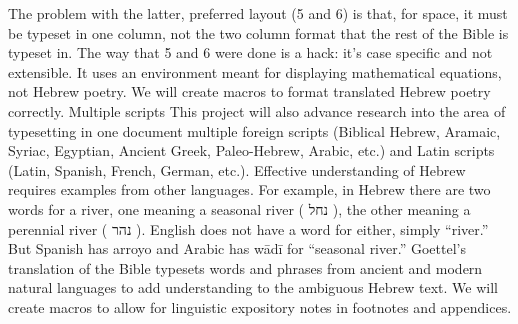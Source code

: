 \documentclass{acm_proc_article-sp}
\begin{document}
The problem with the latter, preferred layout (5 and 6) is that, for space, it must be typeset in one
column, not the two column format that the rest of the Bible is typeset in. The way that 5 and 6 were done
is a hack: it’s case specific and not extensible. It uses an environment meant for displaying mathematical
equations, not Hebrew poetry. We will create macros to format translated Hebrew poetry correctly.
Multiple scripts This project will also advance research into the area of typesetting in one document
multiple foreign scripts (Biblical Hebrew, Aramaic, Syriac, Egyptian, Ancient Greek, Paleo-Hebrew, Arabic,
etc.) and Latin scripts (Latin, Spanish, French, German, etc.). Effective understanding of Hebrew requires
examples from other languages. For example, in Hebrew there are two words for a river, one meaning a
seasonal river ( ‫נחל‬ ), the other meaning a perennial river ( ‫נהר‬ ). English does not have a word for either,
simply “river.” But Spanish has arroyo and Arabic has wādī for “seasonal river.” Goettel’s translation of
the Bible typesets words and phrases from ancient and modern natural languages to add understanding to
the ambiguous Hebrew text. We will create macros to allow for linguistic expository notes in footnotes and
appendices.
\end{document}

